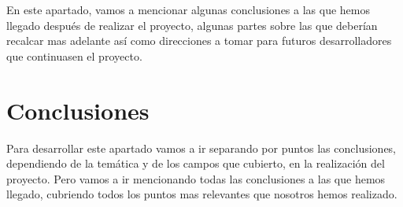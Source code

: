 

En este apartado, vamos a mencionar algunas conclusiones a las que hemos llegado después de realizar el proyecto, algunas partes sobre las que deberían recalcar mas adelante así como direcciones a tomar para futuros desarrolladores que continuasen el proyecto.



\section{Conclusiones}
Para desarrollar este apartado vamos a ir separando por puntos las conclusiones, dependiendo de la temática y de los campos que cubierto, en la realización del proyecto.
Pero vamos a ir mencionando todas las conclusiones a las que hemos llegado, cubriendo todos los puntos mas relevantes que nosotros hemos realizado.

